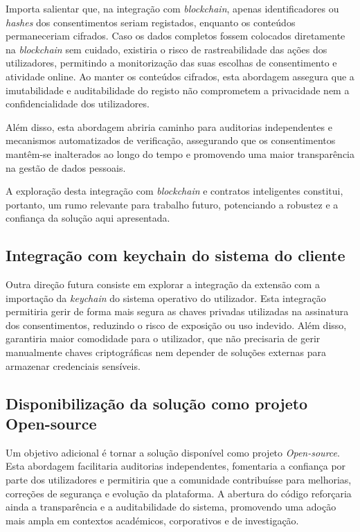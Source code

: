 Importa salientar que, na integração com \textit{blockchain}, apenas identificadores ou \textit{hashes} dos consentimentos seriam registados, enquanto os conteúdos permaneceriam cifrados. Caso os dados completos fossem colocados diretamente na \textit{blockchain} sem cuidado, existiria o risco de rastreabilidade das ações dos utilizadores, permitindo a monitorização das suas escolhas de consentimento e atividade online. Ao manter os conteúdos cifrados, esta abordagem assegura que a imutabilidade e auditabilidade do registo não comprometem a privacidade nem a confidencialidade dos utilizadores.

Além disso, esta abordagem abriria caminho para auditorias independentes e mecanismos automatizados de verificação, assegurando que os consentimentos mantêm-se inalterados ao longo do tempo e promovendo uma maior transparência na gestão de dados pessoais.

A exploração desta integração com \textit{blockchain} e contratos inteligentes constitui, portanto, um rumo relevante para trabalho futuro, potenciando a robustez e a confiança da solução aqui apresentada.

\subsection{Integração com keychain do sistema do cliente}

Outra direção futura consiste em explorar a integração da extensão com a importação da \textit{keychain} do sistema operativo do utilizador. Esta integração permitiria gerir de forma mais segura as chaves privadas utilizadas na assinatura dos consentimentos, reduzindo o risco de exposição ou uso indevido. Além disso, garantiria maior comodidade para o utilizador, que não precisaria de gerir manualmente chaves criptográficas nem depender de soluções externas para armazenar credenciais sensíveis.

\subsection{Disponibilização da solução como projeto Open-source}

Um objetivo adicional é tornar a solução disponível como projeto \textit{Open-source}. Esta abordagem facilitaria auditorias independentes, fomentaria a confiança por parte dos utilizadores e permitiria que a comunidade contribuísse para melhorias, correções de segurança e evolução da plataforma. A abertura do código reforçaria ainda a transparência e a auditabilidade do sistema, promovendo uma adoção mais ampla em contextos académicos, corporativos e de investigação.
